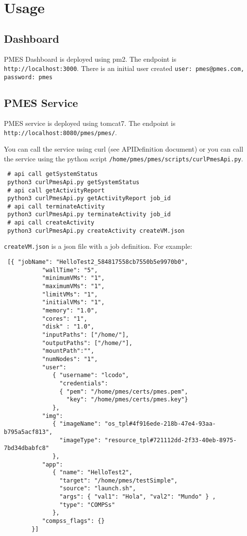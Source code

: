 \documentclass[a4paper,10pt]{article}
\begin{document}
\section{Usage}
\subsection{Dashboard}
PMES Dashboard is  deployed using pm2. The endpoint is \texttt{http://localhost:3000}. There is an initial user created \texttt{user: pmes@pmes.com, password: pmes}

\subsection{PMES Service}
PMES service is  deployed using tomcat7. The endpoint is \texttt{http://localhost:8080/pmes/pmes/}.

You can call the service using curl (see APIDefinition document) or you can call the service using the python script \texttt{/home/pmes/pmes/scripts/curlPmesApi.py}.

\begin{verbatim}
 # api call getSystemStatus
 python3 curlPmesApi.py getSystemStatus
 # api call getActivityReport
 python3 curlPmesApi.py getActivityReport job_id
 # api call terminateActivity
 python3 curlPmesApi.py terminateActivity job_id
 # api call createActivity
 python3 curlPmesApi.py createActivity createVM.json
\end{verbatim}

\texttt{createVM.json} is a json file with a job definition. For example:
\begin{verbatim}
 [{ "jobName": "HelloTest2_584817558cb7550b5e9970b0",
           "wallTime": "5",
           "minimumVMs": "1",
           "maximumVMs": "1",
           "limitVMs": "1",
           "initialVMs": "1",
           "memory": "1.0",
           "cores": "1",
           "disk" : "1.0",
           "inputPaths": ["/home/"],
           "outputPaths": ["/home/"],
           "mountPath":"",
           "numNodes": "1",
           "user":
              { "username": "lcodo",
                "credentials":
                { "pem": "/home/pmes/certs/pmes.pem",
                  "key": "/home/pmes/certs/pmes.key"}
              },
           "img": 
              { "imageName": "os_tpl#4f916ede-218b-47e4-93aa-b795a5acf813", 
                "imageType": "resource_tpl#721112dd-2f33-40eb-8975-7bd34dbabfc8"                
              },
           "app":
              { "name": "HelloTest2",
                "target": "/home/pmes/testSimple",
                "source": "launch.sh",
                "args": { "val1": "Hola", "val2": "Mundo" } ,
                "type": "COMPSs"
              },
           "compss_flags": {}
        }]
\end{verbatim}
\end{document}

